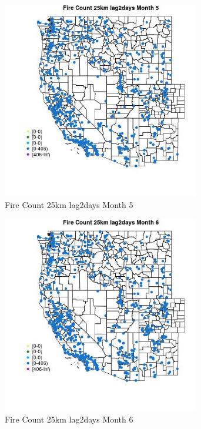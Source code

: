\begin{figure} 
\centering  
\includegraphics[width=0.77\textwidth]{Code_Outputs/Report_ML_input_PM25_Step4_part_f_de_duplicated_aves_prioritize_24hr_obswNAs_MapObsMo5Fire_Count_25km_lag2days.jpg} 
\caption{\label{fig:Report_ML_input_PM25_Step4_part_f_de_duplicated_aves_prioritize_24hr_obswNAsMapObsMo5Fire_Count_25km_lag2days}Fire Count 25km lag2days Month 5} 
\end{figure} 
 

\begin{figure} 
\centering  
\includegraphics[width=0.77\textwidth]{Code_Outputs/Report_ML_input_PM25_Step4_part_f_de_duplicated_aves_prioritize_24hr_obswNAs_MapObsMo6Fire_Count_25km_lag2days.jpg} 
\caption{\label{fig:Report_ML_input_PM25_Step4_part_f_de_duplicated_aves_prioritize_24hr_obswNAsMapObsMo6Fire_Count_25km_lag2days}Fire Count 25km lag2days Month 6} 
\end{figure} 
 

